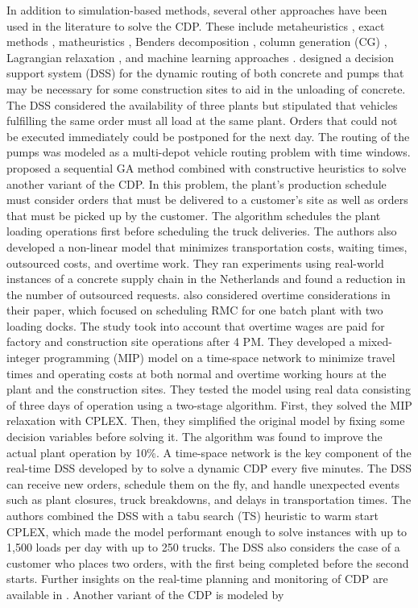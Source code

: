 \documentclass[authoryear,preprint,review,11pt]{elsarticle}
\begin{document}
In addition to simulation-based methods, several other approaches have been used in the literature to solve the CDP. These include metaheuristics \citep{ maghrebi2016sequential, yang2022concrete}, exact methods \citep{asbach2009analysis, kinable2014concrete}, matheuristics \citep{schmid2009hybrid, schmid2010hybridization}, Benders decomposition \citep{maghrebi2014benders}, column generation (CG) \citep{maghrebi2014solving}, Lagrangian relaxation \citep{narayanan2015using}, and machine learning approaches \citep{graham2006modeling}. \cite{matsatsinis2004towards} designed a decision support system (DSS) for the dynamic routing of both concrete and pumps that may be necessary for some construction sites to aid in the unloading of concrete. The DSS considered the availability of three plants but stipulated that vehicles fulfilling the same order must all load at the same plant. Orders that could not be executed immediately could be postponed for the next day. The routing of the pumps was modeled as a multi-depot vehicle routing problem with time windows. \cite{naso2007genetic} proposed a sequential GA method combined with constructive heuristics to solve another variant of the CDP. In this problem, the plant's production schedule must consider orders that must be delivered to a customer's site as well as orders that must be picked up by the customer. The algorithm schedules the plant loading operations first before scheduling the truck deliveries. The authors also developed a non-linear model that minimizes transportation costs, waiting times, outsourced costs, and overtime work. They ran experiments using real-world instances of a concrete supply chain in the Netherlands and found a reduction in the number of outsourced requests. \cite{yan2007optimal} also considered overtime considerations in their paper, which focused on scheduling RMC for one batch plant with two loading docks. The study took into account that overtime wages are paid for factory and construction site operations after 4 PM. They developed a mixed-integer programming (MIP) model on a time-space network to minimize travel times and operating costs at both normal and overtime working hours at the plant and the construction sites. They tested the model using real data consisting of three days of operation using a two-stage algorithm. First, they solved the MIP relaxation with CPLEX. Then, they simplified the original model by fixing some decision variables before solving it. The algorithm was found to improve the actual plant operation by 10\%. A time-space network is the key component of the real-time DSS developed by \cite{durbin2008or} to solve a dynamic CDP every five minutes. The DSS can receive new orders, schedule them on the fly, and handle unexpected events such as plant closures, truck breakdowns, and delays in transportation times. The authors combined the DSS with a tabu search (TS) heuristic to warm start CPLEX, which made the model performant enough to solve instances with up to 1,500 loads per day with up to 250 trucks. The DSS also considers the case of a customer who places two orders, with the first being completed before the second starts. Further insights on the real-time planning and monitoring of CDP are available in \cite{garza2021dynamic}. Another variant of the CDP is modeled by 
\end{document}
